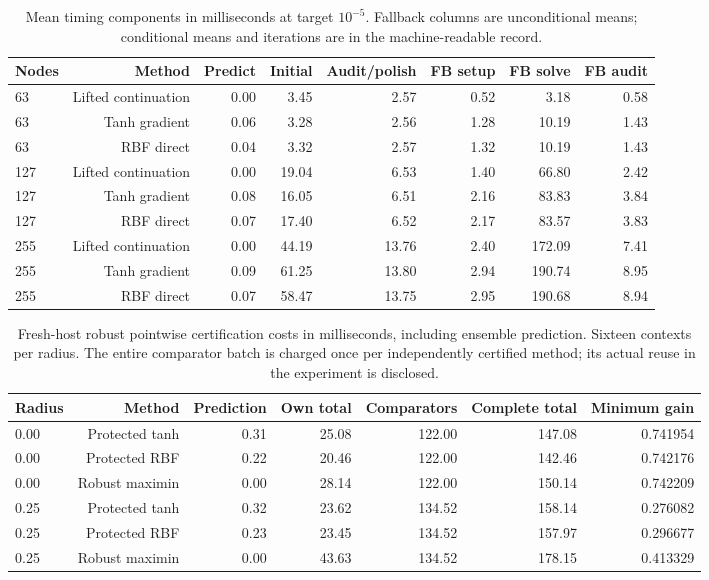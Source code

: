 \documentclass[11pt,letterpaper]{article}
\theoremstyle{definition}
\newcommand{\1}{\mathbf 1}
\begin{document}
\begin{table}[tbp]\centering\scriptsize
\caption{Mean timing components in milliseconds at target $10^{-5}$. Fallback columns are unconditional means; conditional means and iterations are in the machine-readable record.}
\label{tab:r24-components-1e-05}
\begin{tabular}{lrrrrrrr}
\toprule
Nodes & Method & Predict & Initial & Audit/polish & FB setup & FB solve & FB audit\\
\midrule
63 & Lifted continuation & 0.00 & 3.45 & 2.57 & 0.52 & 3.18 & 0.58\\
63 & Tanh gradient & 0.06 & 3.28 & 2.56 & 1.28 & 10.19 & 1.43\\
63 & RBF direct & 0.04 & 3.32 & 2.57 & 1.32 & 10.19 & 1.43\\
127 & Lifted continuation & 0.00 & 19.04 & 6.53 & 1.40 & 66.80 & 2.42\\
127 & Tanh gradient & 0.08 & 16.05 & 6.51 & 2.16 & 83.83 & 3.84\\
127 & RBF direct & 0.07 & 17.40 & 6.52 & 2.17 & 83.57 & 3.83\\
255 & Lifted continuation & 0.00 & 44.19 & 13.76 & 2.40 & 172.09 & 7.41\\
255 & Tanh gradient & 0.09 & 61.25 & 13.80 & 2.94 & 190.74 & 8.95\\
255 & RBF direct & 0.07 & 58.47 & 13.75 & 2.95 & 190.68 & 8.94\\
\bottomrule
\end{tabular}
\end{table}

\begin{table}[tbp]\centering\scriptsize
\caption{Fresh-host robust pointwise certification costs in milliseconds, including ensemble prediction. Sixteen contexts per radius. The entire comparator batch is charged once per independently certified method; its actual reuse in the experiment is disclosed.}
\label{tab:r24-robust-cost}
\begin{tabular}{lrrrrrr}
\toprule
Radius & Method & Prediction & Own total & Comparators & Complete total & Minimum gain\\
\midrule
0.00 & Protected tanh & 0.31 & 25.08 & 122.00 & 147.08 & 0.741954\\
0.00 & Protected RBF & 0.22 & 20.46 & 122.00 & 142.46 & 0.742176\\
0.00 & Robust maximin & 0.00 & 28.14 & 122.00 & 150.14 & 0.742209\\
0.25 & Protected tanh & 0.32 & 23.62 & 134.52 & 158.14 & 0.276082\\
0.25 & Protected RBF & 0.23 & 23.45 & 134.52 & 157.97 & 0.296677\\
0.25 & Robust maximin & 0.00 & 43.63 & 134.52 & 178.15 & 0.413329\\
\bottomrule
\end{tabular}
\end{table}
\end{document}
